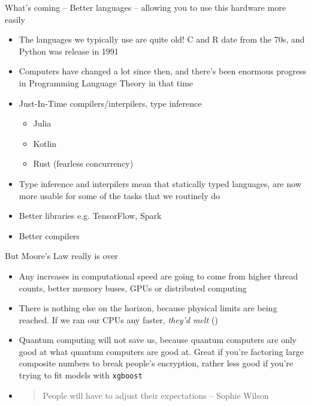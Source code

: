 \documentclass{beamer}
\begin{document}
\begin{frame}{What's coming -- Better languages -- allowing you to use this hardware more easily}
	\begin{itemize}
		\item The languages we typically use are quite old! C and R date from
		the 70s, and Python was release in 1991
		\item Computers have changed a lot since then, and there's been enormous progress in Programming
		Language Theory in that time
		\item Just-In-Time compilers/interpilers, type inference
			\begin{itemize}
				\item Julia
				\item Kotlin
				\item Rust (fearless concurrency)
			\end{itemize} 
        \item Type inference and interpilers mean that statically typed languages,
			  are now more usable for some of the tasks that we routinely do
		\item Better libraries e.g. TensorFlow, Spark
		\item Better compilers
	\end{itemize}
\end{frame}

\begin{frame}{But Moore's Law really is over}
	\begin{itemize}
		\item Any increases in computational speed are going to come from higher thread
		counts, better memory buses, GPUs or distributed computing

		\item There is nothing else on the horizon, because physical limits are being
		reached. If we ran our CPUs any faster, \emph{they'd melt} (\cite{SophieWilson})

		\item Quantum computing will not save us, because quantum computers are only
		good at what quantum computers are good at. Great if you're factoring large
		composite numbers to break people's encryption, rather less good if you're
		trying to fit models with \texttt{xgboost}

		\item
		\begin{quote}
			People will have to adjust their expectations -- Sophie Wilson
		\end{quote}
	\end{itemize}
\end{frame}
\end{document}
